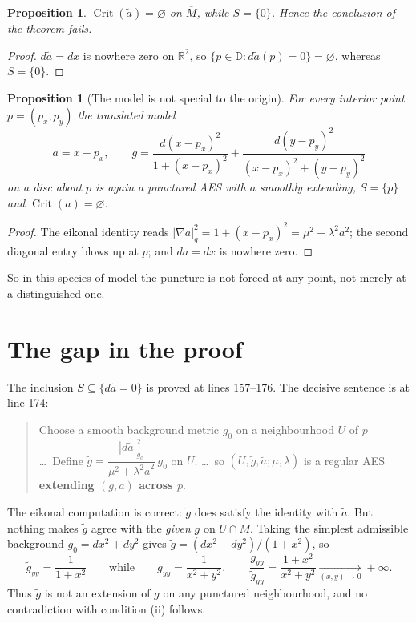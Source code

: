 \documentclass[11pt]{article}
\newtheorem{proposition}[theorem]{Proposition}
\begin{document}
\begin{proposition}
\label{prop:refutes}
$\operatorname{Crit}(\widetilde a)=\varnothing$ on $\overline M$, while
$S=\{0\}$. Hence the conclusion of the theorem fails.
\end{proposition}

\begin{proof}
$d\widetilde a=dx$ is nowhere zero on $\mathbb R^2$, so
$\{p\in\mathbb D:d\widetilde a(p)=0\}=\varnothing$, whereas $S=\{0\}$.
\end{proof}

\begin{proposition}[The model is not special to the origin]
\label{prop:translate}
For \emph{every} interior point $p=(p_x,p_y)$ the translated model
\[
a=x-p_x,\qquad
g=\frac{d(x-p_x)^2}{1+(x-p_x)^2}+\frac{d(y-p_y)^2}{(x-p_x)^2+(y-p_y)^2}
\]
on a disc about $p$ is again a punctured AES with $a$ smoothly extending,
$S=\{p\}$ and $\operatorname{Crit}(a)=\varnothing$.
\end{proposition}

\begin{proof}
The eikonal identity reads $|\nabla a|_g^2=1+(x-p_x)^2=\mu^2+\lambda^2a^2$; the
second diagonal entry blows up at $p$; and $da=dx$ is nowhere zero.
\end{proof}

So in this species of model the puncture is not forced at any point, not merely
at a distinguished one.

\section{The gap in the proof}
\label{sec:gap}

The inclusion $S\subseteq\{d\widetilde a=0\}$ is proved at
 lines 157--176. The decisive sentence is
at line 174:

\begin{quote}
Choose a smooth background metric $g_0$ on a neighbourhood $U$ of $p$
\dots\ Define
$\widetilde g=\dfrac{|d\widetilde a|_{g_0}^2}{\mu^2+\lambda^2\widetilde a^2}\,g_0$
on $U$. \dots\ so
$(U,\widetilde g,\widetilde a;\mu,\lambda)$ is a regular AES \textbf{extending
$(g,a)$ across $p$}.
\end{quote}

The eikonal computation is correct: $\widetilde g$ does satisfy the identity with
$\widetilde a$. But nothing makes $\widetilde g$ agree with the \emph{given} $g$
on $U\cap M$. Taking the simplest admissible background $g_0=dx^2+dy^2$ gives
$\widetilde g=(dx^2+dy^2)/(1+x^2)$, so
\[
\widetilde g_{yy}=\frac1{1+x^2}
\qquad\text{while}\qquad
g_{yy}=\frac{1}{x^2+y^2},
\qquad
\frac{g_{yy}}{\widetilde g_{yy}}=\frac{1+x^2}{x^2+y^2}\xrightarrow[(x,y)\to0]{}+\infty .
\]
Thus $\widetilde g$ is not an extension of $g$ on any punctured neighbourhood, and
no contradiction with condition (ii) follows.
\end{document}
